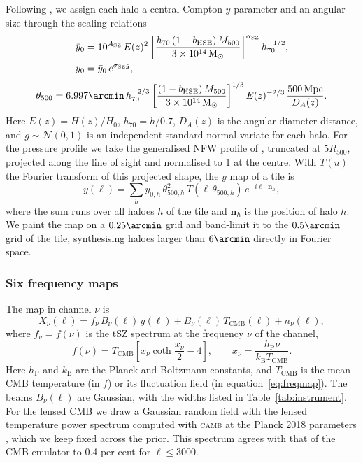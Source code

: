 Following \citet{Zubeldia2025}, we assign each halo a central Compton-$y$ parameter and an angular size
through the scaling relations
\begin{equation}
\begin{split}
\bar y_0 &= 10^{A_\mathrm{SZ}}\,E(z)^2\left[\frac{h_{70}\,(1-b_\mathrm{HSE})\,M_{500}}{3\times10^{14}\,\mathrm{M}_\odot}\right]^{\alpha_\mathrm{SZ}}
h_{70}^{-1/2},\\
y_0 &= \bar y_0\,e^{\sigma_\mathrm{SZ} g},
\end{split}
\label{eq:y0}
\end{equation}
\begin{equation}
\theta_{500} = 6.997\arcmin\,h_{70}^{-2/3}
\left[\frac{(1-b_\mathrm{HSE})\,M_{500}}{3\times10^{14}\,\msun}\right]^{1/3}
E(z)^{-2/3}\,\frac{500\,\mathrm{Mpc}}{D_A(z)}.
\label{eq:theta500}
\end{equation}
Here $E(z)=H(z)/H_0$, $h_{70}=h/0.7$, $D_A(z)$ is the angular diameter distance, and $g\sim\mathcal N(0,1)$
is an independent standard normal variate for each halo. For the pressure profile we take the generalised
NFW profile of \citet{Arnaud2010}, truncated at $5R_{500}$, projected along the line of sight and
normalised to 1 at the centre. With $T(u)$ the Fourier transform of this projected shape, the $y$ map of a
tile is
\begin{equation}
y(\bm\ell) = \sum_h y_{0,h}\,\theta_{500,h}^2\,T(\ell\,\theta_{500,h})\,
e^{-i\bm\ell\cdot\bm n_h},
\label{eq:ymap}
\end{equation}
where the sum runs over all haloes $h$ of the tile and $\bm n_h$ is the position of halo $h$. We paint the
map on a $0.25\arcmin$ grid and band-limit it to the $0.5\arcmin$ grid of the tile, synthesising haloes
larger than $6\arcmin$ directly in Fourier space.

\subsubsection{Six frequency maps}

The map in channel $\nu$ is
\begin{equation}
X_\nu(\bm\ell) = f_\nu\,B_\nu(\ell)\,y(\bm\ell) + B_\nu(\ell)\,T_\mathrm{CMB}(\bm\ell) + n_\nu(\bm\ell),
\label{eq:freqmap}
\end{equation}
where $f_\nu=f(\nu)$ is the tSZ spectrum at the frequency $\nu$ of the channel,
\begin{equation}
f(\nu) = T_\mathrm{CMB}\left[x_\nu\coth\frac{x_\nu}{2}-4\right],\qquad
x_\nu=\frac{h_\mathrm{P}\nu}{k_\mathrm{B}T_\mathrm{CMB}}.
\label{eq:fnu}
\end{equation}
Here $h_\mathrm{P}$ and $k_\mathrm{B}$ are the Planck and Boltzmann constants, and $T_\mathrm{CMB}$ is the
mean CMB temperature (in $f$) or its fluctuation field (in equation~\ref{eq:freqmap}). The beams
$B_\nu(\ell)$ are Gaussian, with the widths listed in Table~\ref{tab:instrument}. For the lensed CMB we
draw a Gaussian random field with the lensed temperature power spectrum computed with \textsc{camb}
\citep{Lewis2000} at the Planck 2018 parameters \citep{Planck2020VI}, which we keep fixed across the prior.
This spectrum agrees with that of the \classyszlite{} CMB emulator to 0.4 per cent for $\ell\le3000$.

